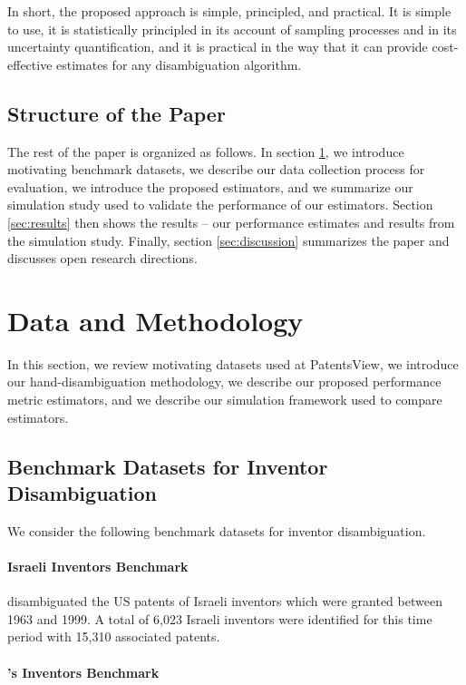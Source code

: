 \documentclass[fontsize=11pt]{article}
\theoremstyle{definition}
\begin{document}
In short, the proposed approach is simple, principled, and practical. It is simple to use, it is statistically principled in its account of sampling processes and in its uncertainty quantification, and it is practical in the way that it can provide cost-effective estimates for any disambiguation algorithm.

\subsection{Structure of the Paper}

The rest of the paper is organized as follows. In section \ref{sec:data_methods}, we introduce motivating benchmark datasets, we describe our data collection process for evaluation, we introduce the proposed estimators, and we summarize our simulation study used to validate the performance of our estimators. Section \ref{sec:results} then shows the results -- our performance estimates and results from the simulation study. Finally, section \ref{sec:discussion} summarizes the paper and discusses open research directions.

\section{Data and Methodology}\label{sec:data_methods}

In this section, we review motivating datasets used at PatentsView, we introduce our hand-disambiguation methodology, we describe our proposed performance metric estimators, and we describe our simulation framework used to compare estimators.

\subsection{Benchmark Datasets for Inventor Disambiguation}

We consider the following benchmark datasets for inventor disambiguation.

\paragraph{Israeli Inventors Benchmark}
\cite{trajtenberg2008identification} disambiguated the US patents of Israeli inventors which were granted between 1963 and 1999. A total of 6,023 Israeli inventors were identified for this time period with 15,310 associated patents.

\paragraph{\cite{Li2014}'s Inventors Benchmark}
\end{document}
